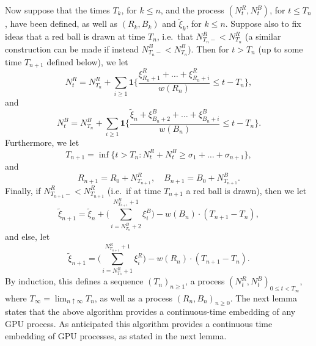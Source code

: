 \documentclass[10pt,a4paper]{amsart}
\newcommand{\1}{{\text{\Large $\mathfrak 1$}}}
\begin{document}
\vspace{0.2cm}
Now suppose that the times $T_k$, for $k\le n$, and the process $(N_t^R,N_t^B)$, for $t\le T_n$, have been defined, as well as $(R_k,B_k)$ and $\widetilde \xi_k$, for $k\le n$. Suppose also to fix ideas that a red ball is drawn at time $T_n$, i.e.~that $N_{T_n-}^R<N_{T_n}^R$ (a similar construction can be made if instead $N_{T_n-}^B<N_{T_n}^B$). Then for $t>T_n$ (up to some time $T_{n+1}$ defined below), we let 
$$N_t^R = N_{T_n}^R +  \sum_{i\ge 1} \mathbf 1\Big\{\frac{\xi_{R_n+1}^R + \dots + \xi_{R_n+i}^R}{w(R_n)} \le t-T_n \Big\}, $$
and
$$N_t^B = N_{T_n}^B +  \sum_{i\ge 1} \mathbf 1\Big\{\frac{\widetilde \xi_n + \xi_{B_n+2}^B+ \dots + \xi_{B_n+i}^B}{w(B_n)} \le t-T_n\Big\}.$$
Furthermore, we let 
$$T_{n+1} = \inf \{t> T_n : N_t^R + N_t^B \ge \sigma_1+\dots+ \sigma_{n+1}\},$$ 
and 
$$R_{n+1} = R_0+ N_{T_{n+1}}^R, \quad B_{n+1} = B_0 + N_{T_{n+1}}^B.$$ 
Finally, if $N_{T_{n+1}-}^R< N_{T_{n+1}}^R$ (i.e.~if at time $T_{n+1}$ a red ball is drawn), then we let 
$$\widetilde \xi_{n+1}= \widetilde \xi_n + \Big(\sum_{i= N_{T_n}^B+2}^{N_{T_{n+1}}^B +1} \xi_i^B\Big)- w(B_n)\cdot (T_{n+1} - T_n),$$ 
and else, let 
$$ \widetilde \xi_{n+1}= \Big(\sum_{i= N_{T_n}^R+1}^{N_{T_{n+1}}^R +1} \xi_i^R\Big)- w(R_n)\cdot (T_{n+1} - T_n).$$ 
By induction, this defines a sequence $(T_n)_{n\ge 1}$, a process $(N_t^R,N_t^B)_{0\le t< T_\infty}$, where $T_\infty = \lim_{n\uparrow \infty} T_n$, as well as a process $(R_n,B_n)_{n\ge 0}$. 
The next lemma states that the above algorithm provides a continuous-time embedding of any GPU process. As anticipated this algorithm provides a continuous time embedding of GPU processes, as stated in the next lemma.  
\end{document}
